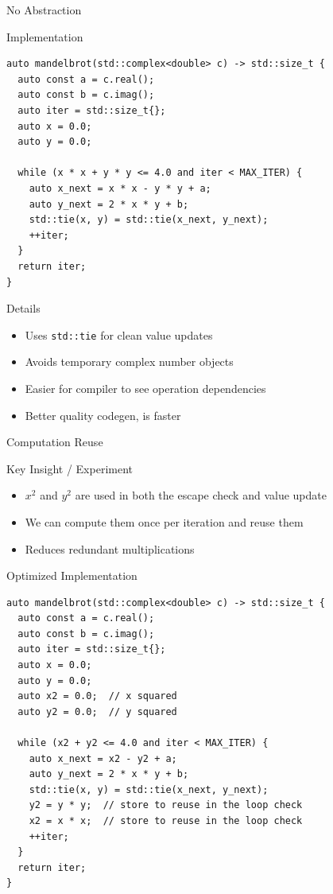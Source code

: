 \documentclass{beamer}
\begin{document}
\begin{frame}[fragile]{No Abstraction}
    \begin{exampleblock}{Implementation}
        \begin{verbatim}
auto mandelbrot(std::complex<double> c) -> std::size_t {
  auto const a = c.real();
  auto const b = c.imag();
  auto iter = std::size_t{};
  auto x = 0.0;
  auto y = 0.0;
  
  while (x * x + y * y <= 4.0 and iter < MAX_ITER) {
    auto x_next = x * x - y * y + a;
    auto y_next = 2 * x * y + b;
    std::tie(x, y) = std::tie(x_next, y_next);
    ++iter;
  }
  return iter;
}
        \end{verbatim}
    \end{exampleblock}
    
    \begin{block}{Details}
        \begin{itemize}
            \item Uses \texttt{std::tie} for clean value updates
            \item Avoids temporary complex number objects
            \item Easier for compiler to see operation dependencies
            \item Better quality codegen, is faster
        \end{itemize}
    \end{block}
\end{frame}

\begin{frame}[fragile]{Computation Reuse}
    \begin{block}{Key Insight / Experiment}
        \begin{itemize}
            \item $x^2$ and $y^2$ are used in both the escape check and value update
            \item We can compute them once per iteration and reuse them
            \item Reduces redundant multiplications
        \end{itemize}
    \end{block}
    \begin{exampleblock}{Optimized Implementation}
        \begin{verbatim}
auto mandelbrot(std::complex<double> c) -> std::size_t {
  auto const a = c.real();
  auto const b = c.imag();
  auto iter = std::size_t{};
  auto x = 0.0;
  auto y = 0.0;
  auto x2 = 0.0;  // x squared
  auto y2 = 0.0;  // y squared
  
  while (x2 + y2 <= 4.0 and iter < MAX_ITER) {
    auto x_next = x2 - y2 + a;
    auto y_next = 2 * x * y + b;
    std::tie(x, y) = std::tie(x_next, y_next);
    y2 = y * y;  // store to reuse in the loop check
    x2 = x * x;  // store to reuse in the loop check
    ++iter;
  }
  return iter;
}
        \end{verbatim}
    \end{exampleblock}
\end{frame}
\end{document}
